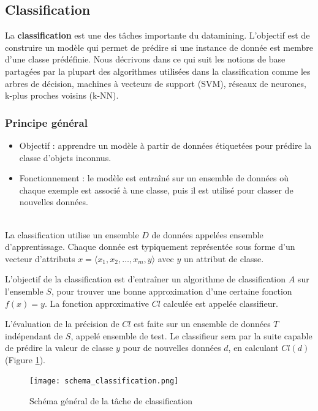\documentclass[a4paper,12pt]{report}
\begin{document}
        \subsection{Classification}
        
        La \textbf{classification} est une des tâches importante du datamining. L’objectif est de construire un modèle qui permet de prédire si une instance de donnée est membre d’une classe prédéfinie.  Nous décrivons dans ce qui suit les notions de base partagées par la plupart des algorithmes utilisées dans la classification comme les arbres de décision, machines à vecteurs de support (SVM), réseaux de neurones, k-plus proches voisins (k-NN).

        \subsubsection{Principe général}


            \begin{itemize}
                \item  Objectif : apprendre un modèle à partir de données étiquetées pour prédire la classe d’objets inconnus.
                \item  Fonctionnement : le modèle est entraîné sur un ensemble de données où chaque exemple est associé à une classe, puis il est utilisé pour classer de nouvelles données.
            \end{itemize}
            {\\}
            La classification utilise un ensemble $D$ de données appelées ensemble d’apprentissage. Chaque donnée est typiquement représentée sous forme d’un vecteur d’attributs 
            $x = \langle x_1, x_2, \dots, x_m, y \rangle$ avec $y$ un attribut de classe. 
            
            L’objectif de la classification est d’entraîner un algorithme de classification $A$ sur l’ensemble $S$, pour trouver une bonne approximation d’une certaine fonction $f(x) = y$. La fonction approximative $Cl$ calculée est appelée classifieur. 
            
            L’évaluation de la précision de $Cl$ est faite sur un ensemble de données $T$ indépendant de $S$, appelé ensemble de test. Le classifieur sera par la suite capable de prédire la valeur de classe $y$ pour de nouvelles données $d$, en calculant $Cl(d)$ (Figure \ref{fig:classification}).
            
            \begin{figure}[h]
                \centering
                \texttt{[image: schema\_classification.png]}
                \caption{Schéma général de la tâche de classification}
                \label{fig:classification}
            \end{figure}
        
\end{document}
